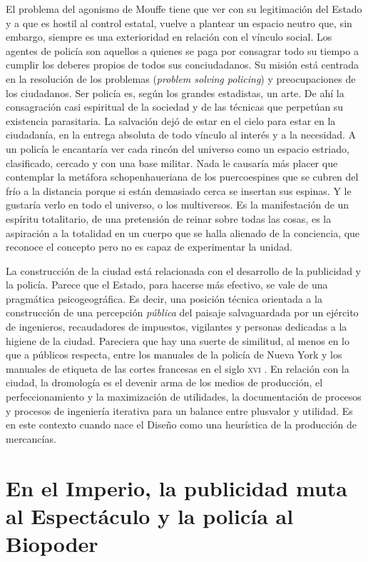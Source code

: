 El problema del agonismo de Mouffe tiene que ver con su legitimación del Estado y a que es hostil al control estatal, vuelve a plantear un espacio neutro que, sin embargo, siempre es una exterioridad en relación con el vínculo social. Los agentes de policía son aquellos a quienes se paga por consagrar todo su tiempo a cumplir los deberes propios de todos sus conciudadanos. Su misión está centrada en la resolución de los problemas (\emph{problem solving policing}) y preocupaciones de los ciudadanos. Ser policía es, según los grandes estadistas, un arte. De ahí la consagración casi espiritual de la sociedad y de las técnicas que perpetúan su existencia parasitaria. La salvación dejó de estar en el cielo para estar en la ciudadanía, en la entrega absoluta de todo vínculo al interés y a la necesidad. A un policía le encantaría ver cada rincón del universo como un espacio estriado, clasificado, cercado y con una base militar. Nada le causaría más placer que contemplar la metáfora schopenhaueriana de los puercoespines que se cubren del frío a la distancia porque si están demasiado cerca se insertan sus espinas. Y le gustaría verlo en todo el universo, o los multiversos. Es la manifestación de un espíritu totalitario, de una pretensión de reinar sobre todas las cosas, es la aspiración a la totalidad en un cuerpo que se halla alienado de la conciencia, que reconoce el concepto pero no es capaz de experimentar la unidad.

La construcción de la ciudad está relacionada con el desarrollo de la publicidad y la policía. Parece que el Estado, para hacerse más efectivo, se vale de una pragmática psicogeográfica. Es decir, una posición técnica orientada a la construcción de una percepción \emph{pública} del paisaje salvaguardada por un ejército de ingenieros, recaudadores de impuestos, vigilantes y personas dedicadas a la higiene de la ciudad. Pareciera que hay una suerte de similitud, al menos en lo que a públicos respecta, entre los manuales de la policía de Nueva York y los manuales de etiqueta de las cortes francesas en el siglo \textsc{xvi} \autocite{tiqqunIntroduccionGuerraCivil2008}. En relación con la ciudad, la dromología es el devenir arma de los medios de producción, el perfeccionamiento y la maximización de utilidades, la documentación de procesos y procesos de ingeniería iterativa para un balance entre plusvalor y utilidad. Es en este contexto cuando nace el Diseño como una heurística de la producción de mercancías.

\section{En el Imperio, la publicidad muta al Espectáculo y la policía al Biopoder}
\label{sec:en-el-imperio}

